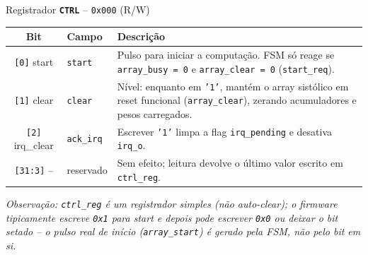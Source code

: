 \documentclass[aspectratio=169,10pt]{beamer}
\newcommand{\bitfield}[2]{\texttt{[#1]} #2}
\newcommand{\regname}[1]{\textbf{\texttt{#1}}}
\begin{document}
\begin{frame}{Registrador \regname{CTRL} -- \texttt{0x000} (R/W)}
  \centering

  \vspace{0.5em}
  \small
  \begin{tabular}{clp{8.5cm}}
    \toprule
    \textbf{Bit} & \textbf{Campo} & \textbf{Descrição} \\
    \midrule
    \bitfield{0}{start} & \texttt{start} & Pulso para iniciar a computação. FSM só reage se
      \texttt{array\_busy = 0} e \texttt{array\_clear = 0} (\texttt{start\_req}). \\
    \bitfield{1}{clear} & \texttt{clear} & Nível: enquanto em \texttt{'1'}, mantém o array sistólico em
      reset funcional (\texttt{array\_clear}), zerando acumuladores e pesos carregados. \\
    \bitfield{2}{irq\_clear} & \texttt{ack\_irq} & Escrever \texttt{'1'} limpa a flag \texttt{irq\_pending}
      e desativa \texttt{irq\_o}. \\
    \bitfield{31:3}{--} & reservado & Sem efeito; leitura devolve o último valor escrito em \texttt{ctrl\_reg}. \\
    \bottomrule
  \end{tabular}
  \vspace{0.3em}
  \scriptsize\textit{Observação: \texttt{ctrl\_reg} é um registrador simples (não auto-clear); o firmware
  tipicamente escreve \texttt{0x1} para start e depois pode escrever \texttt{0x0} ou deixar o bit setado
  -- o pulso real de início (\texttt{array\_start}) é gerado pela FSM, não pelo bit em si.}
\end{frame}
\end{document}
